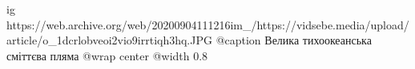  
 
 
 
 

\ifcmt
  ig https://web.archive.org/web/20200904111216im_/https://vidsebe.media/upload/article/o_1dcrlobveoi2vio9irrtiqh3hq.JPG
	@caption Велика тихоокеанська сміттєва пляма
  @wrap center
  @width 0.8
\fi
